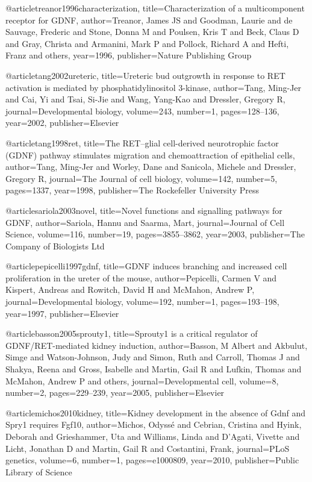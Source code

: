 @article{treanor1996characterization,
  title={Characterization of a multicomponent receptor for GDNF},
  author={Treanor, James JS and Goodman, Laurie and de Sauvage, Frederic and Stone, Donna M and Poulsen, Kris T and Beck, Claus D and Gray, Christa and Armanini, Mark P and Pollock, Richard A and Hefti, Franz and others},
  year={1996},
  publisher={Nature Publishing Group}
}

@article{tang2002ureteric,
  title={Ureteric bud outgrowth in response to RET activation is mediated by phosphatidylinositol 3-kinase},
  author={Tang, Ming-Jer and Cai, Yi and Tsai, Si-Jie and Wang, Yang-Kao and Dressler, Gregory R},
  journal={Developmental biology},
  volume={243},
  number={1},
  pages={128--136},
  year={2002},
  publisher={Elsevier}
}

@article{tang1998ret,
  title={The RET--glial cell-derived neurotrophic factor (GDNF) pathway stimulates migration and chemoattraction of epithelial cells},
  author={Tang, Ming-Jer and Worley, Dane and Sanicola, Michele and Dressler, Gregory R},
  journal={The Journal of cell biology},
  volume={142},
  number={5},
  pages={1337},
  year={1998},
  publisher={The Rockefeller University Press}
}

@article{sariola2003novel,
  title={Novel functions and signalling pathways for GDNF},
  author={Sariola, Hannu and Saarma, Mart},
  journal={Journal of Cell Science},
  volume={116},
  number={19},
  pages={3855--3862},
  year={2003},
  publisher={The Company of Biologists Ltd}
}

@article{pepicelli1997gdnf,
  title={GDNF induces branching and increased cell proliferation in the ureter of the mouse},
  author={Pepicelli, Carmen V and Kispert, Andreas and Rowitch, David H and McMahon, Andrew P},
  journal={Developmental biology},
  volume={192},
  number={1},
  pages={193--198},
  year={1997},
  publisher={Elsevier}
}

@article{basson2005sprouty1,
  title={Sprouty1 is a critical regulator of GDNF/RET-mediated kidney induction},
  author={Basson, M Albert and Akbulut, Simge and Watson-Johnson, Judy and Simon, Ruth and Carroll, Thomas J and Shakya, Reena and Gross, Isabelle and Martin, Gail R and Lufkin, Thomas and McMahon, Andrew P and others},
  journal={Developmental cell},
  volume={8},
  number={2},
  pages={229--239},
  year={2005},
  publisher={Elsevier}
}

@article{michos2010kidney,
  title={Kidney development in the absence of Gdnf and Spry1 requires Fgf10},
  author={Michos, Odyss{\'e} and Cebrian, Cristina and Hyink, Deborah and Grieshammer, Uta and Williams, Linda and D'Agati, Vivette and Licht, Jonathan D and Martin, Gail R and Costantini, Frank},
  journal={PLoS genetics},
  volume={6},
  number={1},
  pages={e1000809},
  year={2010},
  publisher={Public Library of Science}
}


